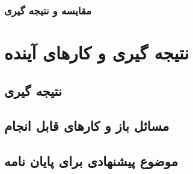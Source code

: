 \documentclass[12pt,a4paper]{report}
\theoremstyle{definition}
\theoremstyle{theorem}
\theoremstyle{definition}
\begin{document}
	\subsection{مقایسه و نتیجه گیری}
	\chapter{نتیجه گیری و کار‌های آینده}
	\section{نتیجه گیری}
	\section{مسائل باز و کارهای قابل انجام}
	\section{موضوع پیشنهادی برای پایان نامه}
	\newpage
	
	\small


\end{document}
